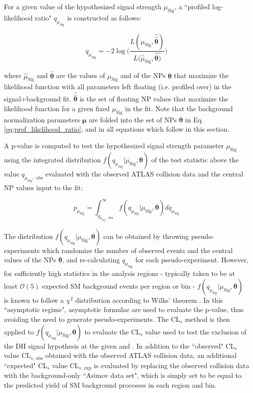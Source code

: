 For a given value of the hypothesized signal strength \(\mu_\text{Sig}\), a ``profiled log-likelihood ratio" \(q_{\mu_\text{Sig}}\) is constructed as follows:

\begin{equation}
\label{eq:prof_likelihood_ratio}
q_{\mu_\text{Sig}} = -2\log\Bigg( \frac{L(\mu_\text{Sig}, \hat{\hat{\boldsymbol{\theta}}})}{L(\hat{\mu}_\text{Sig}, \hat{\boldsymbol{\theta})}} \Bigg)
\end{equation}

\noindent where \(\hat{\mu}_\text{Sig}\) and \(\hat{\boldsymbol{\theta}}\) are the values of \(\mu_\text{Sig}\) and of the NPs \(\boldsymbol{\theta}\) that maximize the likelihood function with all parameters left floating (i.e. profiled over) in the signal+background fit. \(\hat{\hat{\boldsymbol{\theta}}}\) is the set of floating NP values that maximize the likelihood function for a given fixed \(\mu_\text{Sig}\) in the fit. Note that the background normalization parameters \(\boldsymbol{\mu}\) are folded into the set of NPs \(\boldsymbol{\theta}\) in Eq. 
\ref{eq:prof_likelihood_ratio}, and in all equations which follow in this section.

A p-value is computed to test the hypothesized signal strength parameter \(\mu_\text{Sig}\) using the integrated distribution \(f(q_{\mu_\text{Sig}}|\mu_\text{Sig}, \boldsymbol{\theta})\) of the test statistic above the value \(q_{\mu_\text{Sig},\text{ obs}}\) evaluated with the observed ATLAS collision data and the central NP values input to the fit:

\begin{equation}
\label{eq:pvalue}
p_{\mu_\text{Sig}} = \int_{q_{\mu_\text{Sig},\text{ obs}}}^\infty f(q_{\mu_\text{Sig}}|\mu_\text{Sig}, \boldsymbol{\theta})dq_{\mu_\text{Sig}}
\end{equation}

The distribution \(f(q_{\mu_\text{Sig}}|\mu_\text{Sig}, \boldsymbol{\theta})\) can be obtained by throwing pseudo-experiments which randomize the number of observed events and the central values of the NPs \(\boldsymbol{\theta}\), and re-calculating \(q_{\mu_\text{Sig}}\) for each pseudo-experiment. However, for sufficiently high statistics in the analysis regions - typically taken to be at least \(\mathcal{O}(5)\) expected SM background events per region or bin - \(f(q_{\mu_\text{Sig}}|\mu_\text{Sig}, \boldsymbol{\theta})\) is known to follow a \(\chi^2\) distribution according to Wilks' theorem \cite{Wilks_1938}. In this ``asymptotic regime", asymptotic formulae \cite{Cowan_2011} are used to evaluate the p-value, thus avoiding the need to generate pseudo-experiments. The CL\(_s\) method \cite{Read_2002} is then applied to \(f(q_{\mu_\text{Sig}}|\mu_\text{Sig}, \boldsymbol{\theta})\) to evaluate the CL\(_s\) value used to test the exclusion of the DH signal hypothesis at the given \ms and \mZp. In addition to the ``observed" CL\(_s\) value CL\(_{s\text{, obs}}\) obtained with the observed ATLAS collision data, an additional ``expected" CL\(_s\) value CL\(_{s\text{, exp}}\) is evaluated by replacing the observed collision data with the background-only ``Asimov data set", which is simply set to be equal to the predicted yield of SM background processes in each region and bin.

